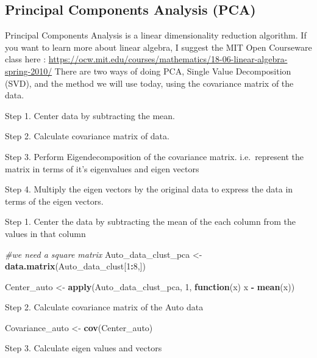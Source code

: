 \documentclass[11pt,]{article}
\newenvironment{Shaded}{\begin{snugshade}}{\end{snugshade}}
\newcommand{\CommentTok}[1]{\textcolor[rgb]{0.56,0.35,0.01}{\textit{#1}}}
\newcommand{\ControlFlowTok}[1]{\textcolor[rgb]{0.13,0.29,0.53}{\textbf{#1}}}
\newcommand{\DecValTok}[1]{\textcolor[rgb]{0.00,0.00,0.81}{#1}}
\newcommand{\KeywordTok}[1]{\textcolor[rgb]{0.13,0.29,0.53}{\textbf{#1}}}
\newcommand{\NormalTok}[1]{#1}
\newcommand{\OperatorTok}[1]{\textcolor[rgb]{0.81,0.36,0.00}{\textbf{#1}}}
\newcommand{\StringTok}[1]{\textcolor[rgb]{0.31,0.60,0.02}{#1}}
\begin{document}
\hypertarget{principal-components-analysis-pca}{%
\subsection{Principal Components Analysis
(PCA)}\label{principal-components-analysis-pca}}

Principal Components Analysis is a linear dimensionality reduction
algorithm. If you want to learn more about linear algebra, I suggest the
MIT Open Courseware class here :
\url{https://ocw.mit.edu/courses/mathematics/18-06-linear-algebra-spring-2010/}
There are two ways of doing PCA, Single Value Decomposition (SVD), and
the method we will use today, using the covariance matrix of the data.

Step 1. Center data by subtracting the mean.

Step 2. Calculate covariance matrix of data.

Step 3. Perform Eigendecomposition of the covariance matrix.
i.e.~represent the matrix in terms of it's eigenvalues and eigen vectors

Step 4. Multiply the eigen vectors by the original data to express the
data in terms of the eigen vectors.

Step 1. Center the data by subtracting the mean of the each column from
the values in that column

\begin{Shaded}
\begin{Highlighting}[]
\CommentTok{#we need a square matrix}
\NormalTok{Auto_data_clust_pca <-}\StringTok{ }\KeywordTok{data.matrix}\NormalTok{(Auto_data_clust[}\DecValTok{1}\OperatorTok{:}\DecValTok{8}\NormalTok{,])}

\NormalTok{Center_auto <-}\StringTok{ }\KeywordTok{apply}\NormalTok{(Auto_data_clust_pca, }\DecValTok{1}\NormalTok{, }\ControlFlowTok{function}\NormalTok{(x) x }\OperatorTok{-}\StringTok{ }\KeywordTok{mean}\NormalTok{(x))}
\end{Highlighting}
\end{Shaded}

Step 2. Calculate covariance matrix of the Auto data

\begin{Shaded}
\begin{Highlighting}[]
\NormalTok{Covariance_auto <-}\StringTok{ }\KeywordTok{cov}\NormalTok{(Center_auto)}
\end{Highlighting}
\end{Shaded}

Step 3. Calculate eigen values and vectors
\end{document}
